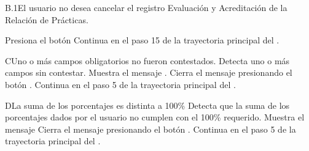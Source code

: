 \begin{UCtrayectoriaA}{B.1}{El usuario no desea cancelar el registro Evaluación y Acreditación de la Relación de Prácticas.}

\UCpaso[\UCactor] Presiona el botón 
\UCpaso Continua en el paso 15 de la trayectoria principal del .

\end{UCtrayectoriaA}

\begin{UCtrayectoriaA}{C}{Uno o más campos obligatorios no fueron contestados.}
\UCpaso Detecta uno o más campos sin contestar.
\UCpaso Muestra el mensaje .
\UCpaso[\UCactor] Cierra el mensaje presionando el botón .
\UCpaso Continua en el paso 5 de la trayectoria principal del .
\end{UCtrayectoriaA}

\begin{UCtrayectoriaA}{D}{La suma de los porcentajes es distinta a 100\%}
\UCpaso Detecta que la suma de los porcentajes dados por el usuario no cumplen con el 100\% requerido.
\UCpaso Muestra el mensaje 
\UCpaso[\UCactor] Cierra el mensaje presionando el botón .
\UCpaso Continua en el paso 5 de la trayectoria principal del .
\end{UCtrayectoriaA}

